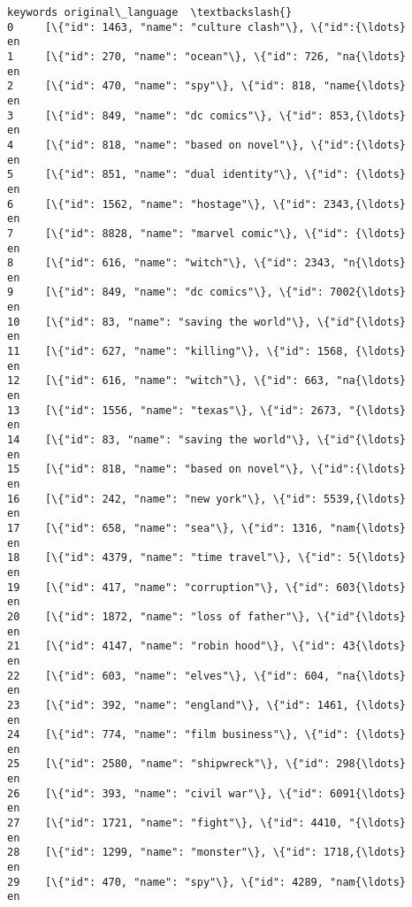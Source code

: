 \documentclass[11pt]{article}
\begin{document}
\begin{Verbatim}[commandchars=\\\{\}]
                                               keywords original\_language  \textbackslash{}
0     [\{"id": 1463, "name": "culture clash"\}, \{"id":{\ldots}                en   
1     [\{"id": 270, "name": "ocean"\}, \{"id": 726, "na{\ldots}                en   
2     [\{"id": 470, "name": "spy"\}, \{"id": 818, "name{\ldots}                en   
3     [\{"id": 849, "name": "dc comics"\}, \{"id": 853,{\ldots}                en   
4     [\{"id": 818, "name": "based on novel"\}, \{"id":{\ldots}                en   
5     [\{"id": 851, "name": "dual identity"\}, \{"id": {\ldots}                en   
6     [\{"id": 1562, "name": "hostage"\}, \{"id": 2343,{\ldots}                en   
7     [\{"id": 8828, "name": "marvel comic"\}, \{"id": {\ldots}                en   
8     [\{"id": 616, "name": "witch"\}, \{"id": 2343, "n{\ldots}                en   
9     [\{"id": 849, "name": "dc comics"\}, \{"id": 7002{\ldots}                en   
10    [\{"id": 83, "name": "saving the world"\}, \{"id"{\ldots}                en   
11    [\{"id": 627, "name": "killing"\}, \{"id": 1568, {\ldots}                en   
12    [\{"id": 616, "name": "witch"\}, \{"id": 663, "na{\ldots}                en   
13    [\{"id": 1556, "name": "texas"\}, \{"id": 2673, "{\ldots}                en   
14    [\{"id": 83, "name": "saving the world"\}, \{"id"{\ldots}                en   
15    [\{"id": 818, "name": "based on novel"\}, \{"id":{\ldots}                en   
16    [\{"id": 242, "name": "new york"\}, \{"id": 5539,{\ldots}                en   
17    [\{"id": 658, "name": "sea"\}, \{"id": 1316, "nam{\ldots}                en   
18    [\{"id": 4379, "name": "time travel"\}, \{"id": 5{\ldots}                en   
19    [\{"id": 417, "name": "corruption"\}, \{"id": 603{\ldots}                en   
20    [\{"id": 1872, "name": "loss of father"\}, \{"id"{\ldots}                en   
21    [\{"id": 4147, "name": "robin hood"\}, \{"id": 43{\ldots}                en   
22    [\{"id": 603, "name": "elves"\}, \{"id": 604, "na{\ldots}                en   
23    [\{"id": 392, "name": "england"\}, \{"id": 1461, {\ldots}                en   
24    [\{"id": 774, "name": "film business"\}, \{"id": {\ldots}                en   
25    [\{"id": 2580, "name": "shipwreck"\}, \{"id": 298{\ldots}                en   
26    [\{"id": 393, "name": "civil war"\}, \{"id": 6091{\ldots}                en   
27    [\{"id": 1721, "name": "fight"\}, \{"id": 4410, "{\ldots}                en   
28    [\{"id": 1299, "name": "monster"\}, \{"id": 1718,{\ldots}                en   
29    [\{"id": 470, "name": "spy"\}, \{"id": 4289, "nam{\ldots}                en   

\end{Verbatim}
\end{document}
